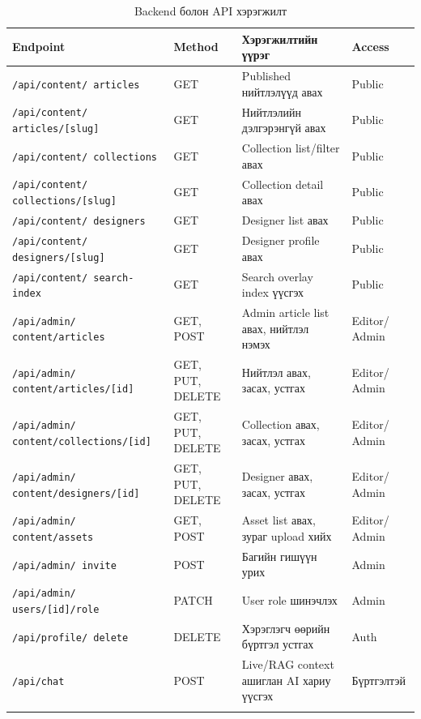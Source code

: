 {\small
\begin{longtable}{|L{0.26\textwidth}|L{0.14\textwidth}|L{0.28\textwidth}|L{0.14\textwidth}|}
  \hline
  \textbf{Endpoint} & \textbf{Method} & \textbf{Хэрэгжилтийн үүрэг} & \textbf{Access} \\ \hline
  \texttt{/api/content/ articles} & GET & Published нийтлэлүүд авах & Public \\ \hline
  \texttt{/api/content/ articles/[slug]} & GET & Нийтлэлийн дэлгэрэнгүй авах & Public \\ \hline
  \texttt{/api/content/ collections} & GET & Collection list/filter авах & Public \\ \hline
  \texttt{/api/content/ collections/[slug]} & GET & Collection detail авах & Public \\ \hline
  \texttt{/api/content/ designers} & GET & Designer list авах & Public \\ \hline
  \texttt{/api/content/ designers/[slug]} & GET & Designer profile авах & Public \\ \hline
  \texttt{/api/content/ search-index} & GET & Search overlay index үүсгэх & Public \\ \hline
  \texttt{/api/admin/ content/articles} & GET, POST & Admin article list авах, нийтлэл нэмэх & Editor/ Admin \\ \hline
  \texttt{/api/admin/ content/articles/[id]} & GET, PUT, DELETE & Нийтлэл авах, засах, устгах & Editor/ Admin \\ \hline
  \texttt{/api/admin/ content/collections/[id]} & GET, PUT, DELETE & Collection авах, засах, устгах & Editor/ Admin \\ \hline
  \texttt{/api/admin/ content/designers/[id]} & GET, PUT, DELETE & Designer авах, засах, устгах & Editor/ Admin \\ \hline
  \texttt{/api/admin/ content/assets} & GET, POST & Asset list авах, зураг upload хийх & Editor/ Admin \\ \hline
  \texttt{/api/admin/ invite} & POST & Багийн гишүүн урих & Admin \\ \hline
  \texttt{/api/admin/ users/[id]/role} & PATCH & User role шинэчлэх & Admin \\ \hline
  \texttt{/api/profile/ delete} & DELETE & Хэрэглэгч өөрийн бүртгэл устгах & Auth \\ \hline
  \texttt{/api/chat} & POST & Live/RAG context ашиглан AI хариу үүсгэх & Бүртгэлтэй \\ \hline
  \caption{Backend болон API хэрэгжилт}
  \label{tab:ch4-backend-api}\\
\end{longtable}
}

